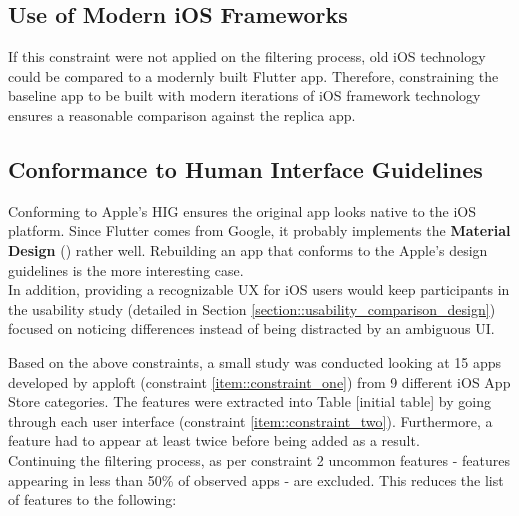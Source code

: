 \subsection*{Use of Modern iOS Frameworks}
If this constraint were not applied on the filtering process, old iOS technology could be compared to a modernly built Flutter app. 
Therefore, constraining the baseline app to be built with modern iterations of iOS framework technology ensures a reasonable comparison 
against the replica app.\\


\subsection*{Conformance to Human Interface Guidelines}
Conforming to Apple's HIG ensures the original app looks native to the iOS platform.
Since Flutter comes from Google, it probably implements the \textbf{Material Design} (\cite{Google2021}) rather well. Rebuilding an app that conforms to the Apple's design guidelines is the more interesting case.\\
In addition, providing a recognizable UX for iOS users would keep participants in the usability study (detailed in Section \ref{section::usability_comparison_design}) focused on noticing differences instead of 
being distracted by an ambiguous UI.\\
\hfill \break


Based on the above constraints, a small study was conducted looking at 15 apps developed by apploft (constraint \ref{item::constraint_one}) from 9 different iOS App Store categories. 
The features were extracted into Table [initial table] by going through each user interface (constraint \ref{item::constraint_two}).
Furthermore, a feature had to appear at least twice before being added as a result.\\
Continuing the filtering process, as per constraint 2 uncommon features - features appearing
in less than 50\% of observed apps - are excluded. This reduces the list of features to the following:

